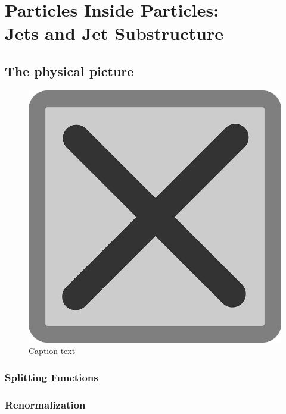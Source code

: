 \chapter{Particles Inside Particles:\\Jets and Jet Substructure}

\section{The physical picture}

\begin{figure}[t!]
    \centering
    \includegraphics[width=\textwidth]{figures/tempfig}

    \caption{
        Caption text
    }

    \label{fig:label}
\end{figure}

\subsection{Splitting Functions}

\subsection{Renormalization}

\section{}
